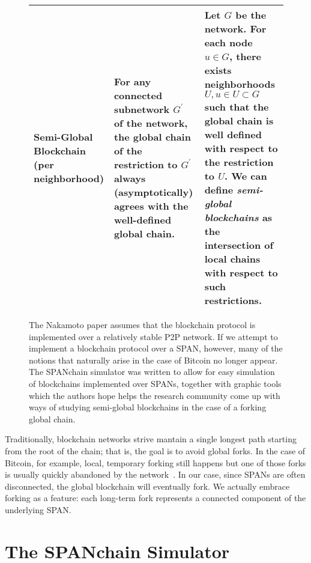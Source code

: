 \begin{figure*}
\begin{tabular}{|p{3cm}||p{6.7cm}|p{6.7cm}|}
		\raggedright
		\textbf{Semi-Global Blockchain (per neighborhood)} &
			For any connected subnetwork $G^\prime$ of the network, the
			global chain of the restriction to $G^\prime$ always
			(asymptotically) agrees with the well-defined global
			chain.
			&
			Let $G$ be the network. For each node $u\in G$, there exists
			neighborhoods $U,u\in U\subset G$ such that the global
			chain is well defined with respect to the restriction
			to $U$. We can define \textit{semi-global blockchains}
			as the intersection of local chains with respect to
			such restrictions.
			\\
		\hline
	\end{tabular}
	\caption{The Nakamoto paper assumes that the blockchain protocol is
		implemented over a relatively stable P2P network. If we attempt to
		implement a blockchain protocol over a SPAN, however, many of the
		notions that naturally arise in the case of Bitcoin no longer appear.
		The SPANchain simulator was written to allow for easy simulation of 
		blockchains implemented over SPANs, together with graphic tools which
		the authors hope helps the research community come up with ways
		of studying semi-global blockchains in the case of a forking global chain.}
	\label{tab:three_table}
\end{figure*}

Traditionally,
blockchain networks strive mantain a single longest path
starting from the root of the chain;
that is,
the goal is to avoid global forks.
In the case of Bitcoin,
for example,
local, temporary forking still happens
but one of those forks is usually quickly abandoned by the network~\cite{decker_2013}.
In our case,
since SPANs are often disconnected,
the global blockchain will eventually fork.
We actually embrace forking as a feature:
each long-term fork represents a connected component of the underlying SPAN.

\section{The SPANchain Simulator}
\label{sec:SPANchain}

